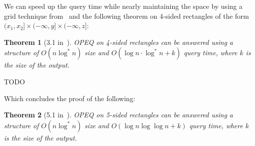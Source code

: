\documentclass[letterpaper,12pt,twocolumn]{article}
\newcommand{\BigOh}[1]{O\!\left(#1\right)}
\newcommand\bounds[1]{(#1]} %
\theoremstyle{plain}
\newtheorem{theorem}{Theorem}
\begin{document}
We can speed up the query time while nearly maintaining the space by
using a grid technique from~\cite{alstrup2000new} and the following
theorem on 4-sided rectangles of the form 
$\bounds{x_1,x_2} \times \bounds{-\infty, y} \times \bounds{-\infty,z}$:

\begin{theorem}[3.1 in~\cite{saladi2015improved}]

  OPEQ on 4-sided rectangles can be answered using a structure of
  $\BigOh{n\log^* n}$ size and $\BigOh{\log n \cdot \log^* n + k}$
  query time, where $k$ is the size of the output.

\end{theorem}

TODO

Which concludes the proof of the following:

\begin{theorem}[5.1 in~\cite{saladi2015improved}]

  OPEQ on 5-sided rectangles can be answered using a structure of
  $\BigOh{n\log^* n}$ size and $\BigOh{\log n \log\log n + k}$ query
  time, where $k$ is the size of the output.

\end{theorem}



\end{document}
